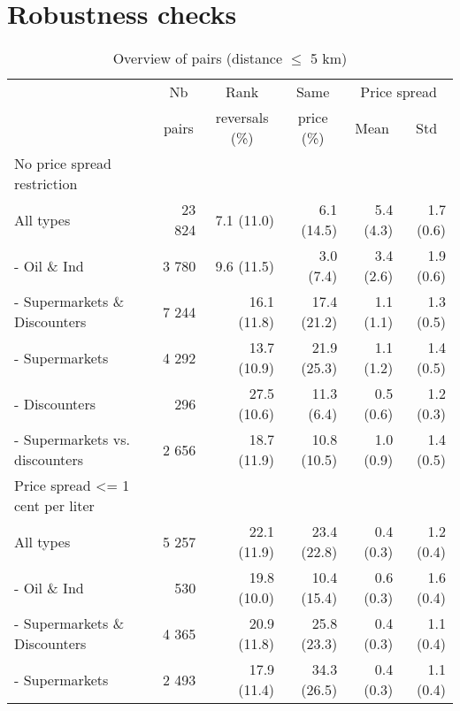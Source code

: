 \documentclass[english]{article}
\begin{document}
\newpage

\section{Robustness checks}

\begin{table}[H]
\begin{threeparttable}
\renewcommand{\arraystretch}{0.8} %
\caption{Overview of pairs (distance $\le$ 5 km)}
\label{tab:stats_pair_rank_reversals}
    \begin{tabular}{lrrrrr}
    \toprule
    \toprule
          & \multicolumn{1}{c}{Nb} & \multicolumn{1}{c}{Rank} & \multicolumn{1}{c}{Same} & \multicolumn{2}{c}{Price spread} \\
          & \multicolumn{1}{c}{pairs} & \multicolumn{1}{c}{reversals (\%)} & \multicolumn{1}{c}{price (\%)} & \multicolumn{1}{c}{Mean} & \multicolumn{1}{c}{Std} \\
    \midrule
    No price spread restriction &       &       &       &       &  \\
    All types & 23 824 & 7.1 (11.0) & 6.1 (14.5) & 5.4 (4.3) & 1.7 (0.6) \\
    - Oil \& Ind & 3 780 & 9.6 (11.5) & 3.0 \phantom{0}(7.4) & 3.4 (2.6) & 1.9 (0.6) \\
    - Supermarkets \& Discounters & 7 244 & 16.1 (11.8) & 17.4 (21.2) & 1.1 (1.1) & 1.3 (0.5) \\
    \hspace*{4mm} - Supermarkets & 4 292 & 13.7 (10.9) & 21.9 (25.3) & 1.1 (1.2) & 1.4 (0.5) \\
    \hspace*{4mm} -  Discounters & 296   & 27.5 (10.6) & 11.3 \phantom{0}(6.4) & 0.5 (0.6) & 1.2 (0.3) \\
    \hspace*{4mm} -  Supermarkets vs. discounters & 2 656 & 18.7 (11.9) & 10.8 (10.5) & 1.0 (0.9) & 1.4 (0.5) \\
    \midrule
    Price spread <= 1 cent per liter &       &       &       &       &  \\
    All types & 5 257 & 22.1 (11.9) & 23.4 (22.8) & 0.4 (0.3) & 1.2 (0.4) \\
    - Oil \& Ind & 530   & 19.8 (10.0) & 10.4 (15.4) & 0.6 (0.3) & 1.6 (0.4) \\
    - Supermarkets \& Discounters & 4 365 & 20.9 (11.8) & 25.8 (23.3) & 0.4 (0.3) & 1.1 (0.4) \\
    \hspace*{4mm} - Supermarkets & 2 493 & 17.9 (11.4) & 34.3 (26.5) & 0.4 (0.3) & 1.1 (0.4) \\

\end{tabular}
\end{threeparttable}
\end{table}
\end{document}
